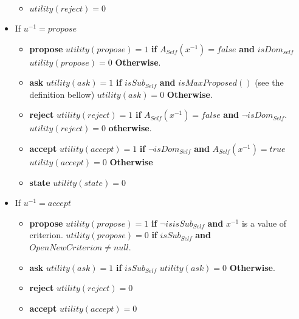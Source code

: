 \documentclass{article}
\begin{document}
\begin{itemize}
\begin{itemize}
		\item $utility(reject) = 0$
		\\
	\end{itemize}
	\item If $u ^{-1} =propose$ 
	\begin{itemize}
		\item \textbf{propose}
			\subitem $utility(propose) = 1$ \textbf{ if } $A_{Self} (x^{-1})= false$ \textbf{ and } $isDom_{self}$
			\subitem $utility(propose) = 0$  \textbf{Otherwise}.
		\item \textbf{ask}	
			\subitem $utility(ask) = 1$ \textbf{ if } $isSub_{Self}$ \textbf{ and } $isMaxProposed()$ (see the definition bellow)
			\subitem $utility(ask) = 0$ \textbf{Otherwise}.
		\item \textbf{reject}	
			\subitem $utility(reject) = 1$  \textbf{ if } $A_{Self} (x^{-1}) = false$ \textbf{ and } $\neg isDom_{Self}$.
			\subitem $utility(reject) = 0 $ \textbf{otherwise}.
		\item \textbf{accept}	
			\subitem $utility(accept) = 1$ \textbf{ if } $ \neg isDom_{Self}$ \textbf{ and }  $A_{Self} (x^{-1}) = true$ 
			\subitem $utility(accept) = 0 $ \textbf{Otherwise}
			
		\item \textbf{ state}
			\subitem $utility(state) = 0$
			\\
	\end{itemize}
	\item If $u^{-1}=accept$
	\begin{itemize}
	\item \textbf{propose}
		\subitem $utility(propose) = 1$ \textbf{ if } $ \neg isisSub_{Self}$ \textbf{ and } $x^{-1}$ is a value of criterion. 
		\subitem $utility(propose) = 0$  \textbf{ if } $isSub_{Self}$ \textbf{ and } $OpenNewCriterion \not= null$.
	\item \textbf{ask}	
		\subitem $utility(ask) = 1$ \textbf{ if } $isSub_{Self}$
		\subitem $utility(ask) = 0$ \textbf{Otherwise}.
	\item \textbf{reject}	
		\subitem $utility(reject) = 0 $ 
	\item \textbf{accept}	
		\subitem $utility(accept) = 0 $
	

\end{itemize}
\end{itemize}
\end{document}
